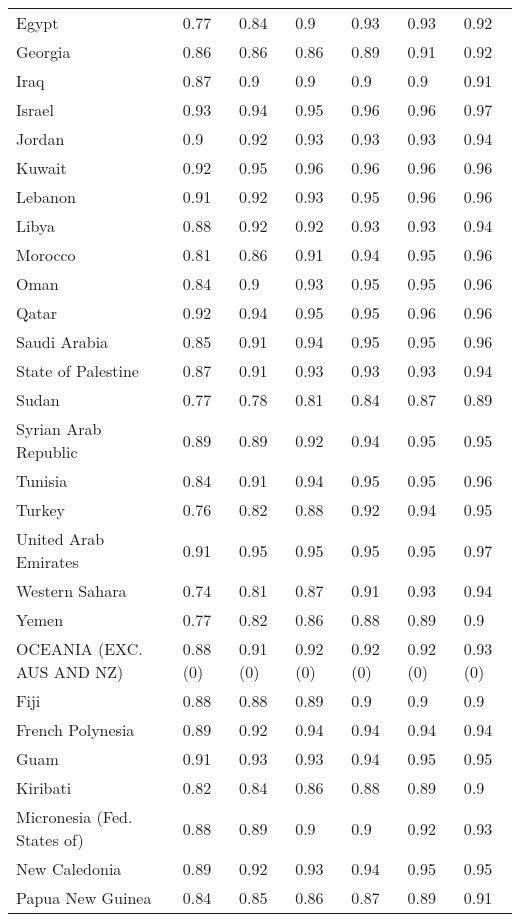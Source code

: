 \begin{longtable}[t]{lllllll}
Egypt & 0.77 & 0.84 & 0.9 & 0.93 & 0.93 & 0.92\\
Georgia & 0.86 & 0.86 & 0.86 & 0.89 & 0.91 & 0.92\\
Iraq & 0.87 & 0.9 & 0.9 & 0.9 & 0.9 & 0.91\\
Israel & 0.93 & 0.94 & 0.95 & 0.96 & 0.96 & 0.97\\
Jordan & 0.9 & 0.92 & 0.93 & 0.93 & 0.93 & 0.94\\
Kuwait & 0.92 & 0.95 & 0.96 & 0.96 & 0.96 & 0.96\\
Lebanon & 0.91 & 0.92 & 0.93 & 0.95 & 0.96 & 0.96\\
Libya & 0.88 & 0.92 & 0.92 & 0.93 & 0.93 & 0.94\\
Morocco & 0.81 & 0.86 & 0.91 & 0.94 & 0.95 & 0.96\\
Oman & 0.84 & 0.9 & 0.93 & 0.95 & 0.95 & 0.96\\
Qatar & 0.92 & 0.94 & 0.95 & 0.95 & 0.96 & 0.96\\
Saudi Arabia & 0.85 & 0.91 & 0.94 & 0.95 & 0.95 & 0.96\\
State of Palestine & 0.87 & 0.91 & 0.93 & 0.93 & 0.93 & 0.94\\
Sudan & 0.77 & 0.78 & 0.81 & 0.84 & 0.87 & 0.89\\
Syrian Arab Republic & 0.89 & 0.89 & 0.92 & 0.94 & 0.95 & 0.95\\
Tunisia & 0.84 & 0.91 & 0.94 & 0.95 & 0.95 & 0.96\\
Turkey & 0.76 & 0.82 & 0.88 & 0.92 & 0.94 & 0.95\\
United Arab Emirates & 0.91 & 0.95 & 0.95 & 0.95 & 0.95 & 0.97\\
Western Sahara & 0.74 & 0.81 & 0.87 & 0.91 & 0.93 & 0.94\\
Yemen & 0.77 & 0.82 & 0.86 & 0.88 & 0.89 & 0.9\\
OCEANIA (EXC. AUS AND NZ) & 0.88 (0) & 0.91 (0) & 0.92 (0) & 0.92 (0) & 0.92 (0) & 0.93 (0)\\
Fiji & 0.88 & 0.88 & 0.89 & 0.9 & 0.9 & 0.9\\
French Polynesia & 0.89 & 0.92 & 0.94 & 0.94 & 0.94 & 0.94\\
Guam & 0.91 & 0.93 & 0.93 & 0.94 & 0.95 & 0.95\\
Kiribati & 0.82 & 0.84 & 0.86 & 0.88 & 0.89 & 0.9\\
Micronesia (Fed. States of) & 0.88 & 0.89 & 0.9 & 0.9 & 0.92 & 0.93\\
New Caledonia & 0.89 & 0.92 & 0.93 & 0.94 & 0.95 & 0.95\\
Papua New Guinea & 0.84 & 0.85 & 0.86 & 0.87 & 0.89 & 0.91\\

\end{longtable}
